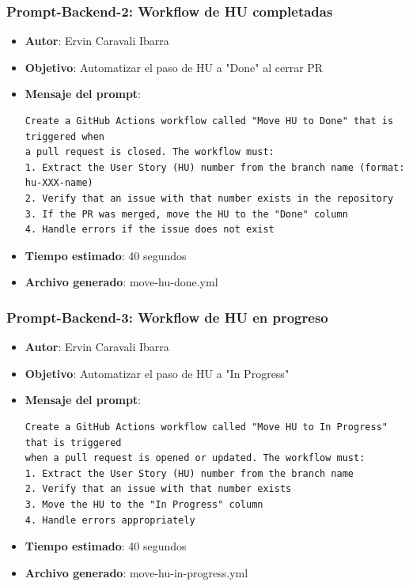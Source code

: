 \documentclass[12pt]{article}
\begin{document}
\subsubsection{Prompt-Backend-2: Workflow de HU completadas}
\begin{itemize}
    \item \textbf{Autor}: Ervin Caravali Ibarra
    \item \textbf{Objetivo}: Automatizar el paso de HU a "Done" al cerrar PR
    \item \textbf{Mensaje del prompt}:
    \begin{verbatim}
Create a GitHub Actions workflow called "Move HU to Done" that is triggered when 
a pull request is closed. The workflow must:
1. Extract the User Story (HU) number from the branch name (format: hu-XXX-name)
2. Verify that an issue with that number exists in the repository
3. If the PR was merged, move the HU to the "Done" column
4. Handle errors if the issue does not exist
    \end{verbatim}
    \item \textbf{Tiempo estimado}: 40 segundos
    \item \textbf{Archivo generado}: move-hu-done.yml
\end{itemize}

\subsubsection{Prompt-Backend-3: Workflow de HU en progreso}
\begin{itemize}
    \item \textbf{Autor}: Ervin Caravali Ibarra
    \item \textbf{Objetivo}: Automatizar el paso de HU a "In Progress"
    \item \textbf{Mensaje del prompt}:
    \begin{verbatim}
Create a GitHub Actions workflow called "Move HU to In Progress" that is triggered
when a pull request is opened or updated. The workflow must:
1. Extract the User Story (HU) number from the branch name
2. Verify that an issue with that number exists
3. Move the HU to the "In Progress" column
4. Handle errors appropriately
    \end{verbatim}
    \item \textbf{Tiempo estimado}: 40 segundos
    \item \textbf{Archivo generado}: move-hu-in-progress.yml
\end{itemize}
\end{document}
